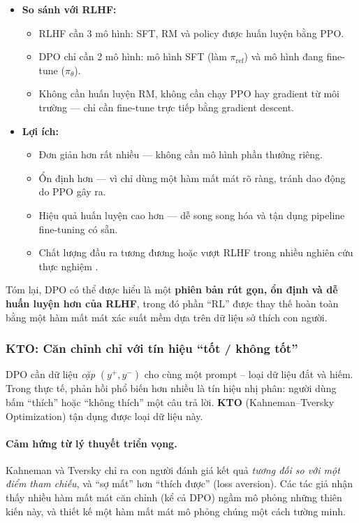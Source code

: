 \begin{itemize}
    \item \textbf{So sánh với RLHF:}
    \begin{itemize}
        \item RLHF cần 3 mô hình: SFT, RM và policy được huấn luyện bằng PPO.
        \item DPO chỉ cần 2 mô hình: mô hình SFT (làm $\pi_{\text{ref}}$) và mô hình đang fine-tune ($\pi_{\theta}$).
        \item Không cần huấn luyện RM, không cần chạy PPO hay gradient từ môi trường — chỉ cần fine-tune trực tiếp bằng gradient descent.
    \end{itemize}

    \item \textbf{Lợi ích:}
    \begin{itemize}
        \item Đơn giản hơn rất nhiều — không cần mô hình phần thưởng riêng.
        \item Ổn định hơn — vì chỉ dùng một hàm mất mát rõ ràng, tránh dao động do PPO gây ra.
        \item Hiệu quả huấn luyện cao hơn — dễ song song hóa và tận dụng pipeline fine-tuning có sẵn.
        \item Chất lượng đầu ra tương đương hoặc vượt RLHF trong nhiều nghiên cứu thực nghiệm \cite{rafailov2023direct}.
    \end{itemize}
\end{itemize}

\noindent
Tóm lại, DPO có thể được hiểu là một \textbf{phiên bản rút gọn, ổn định và dễ huấn luyện hơn của RLHF}, trong đó phần “RL” được thay thế hoàn toàn bằng một hàm mất mát xác suất mềm dựa trên dữ liệu sở thích con người.

\subsubsection{KTO: Căn chỉnh chỉ với tín hiệu “tốt / không tốt” \newtag}
\label{ssec:kto}
DPO cần dữ liệu \emph{cặp} $(y^+, y^-)$ cho cùng một prompt -- loại dữ liệu đắt và hiếm. Trong thực tế, phản hồi phổ biến hơn nhiều là tín hiệu nhị phân: người dùng bấm “thích” hoặc “không thích” một câu trả lời. \textbf{KTO} (Kahneman--Tversky Optimization) \cite{ethayarajh2024kto} tận dụng được loại dữ liệu này.

\paragraph{Cảm hứng từ lý thuyết triển vọng.} Kahneman và Tversky chỉ ra con người đánh giá kết quả \emph{tương đối so với một điểm tham chiếu}, và “sợ mất” hơn “thích được” (loss aversion). Các tác giả nhận thấy nhiều hàm mất mát căn chỉnh (kể cả DPO) ngầm mô phỏng những thiên kiến này, và thiết kế một hàm mất mát mô phỏng chúng một cách tường minh.

